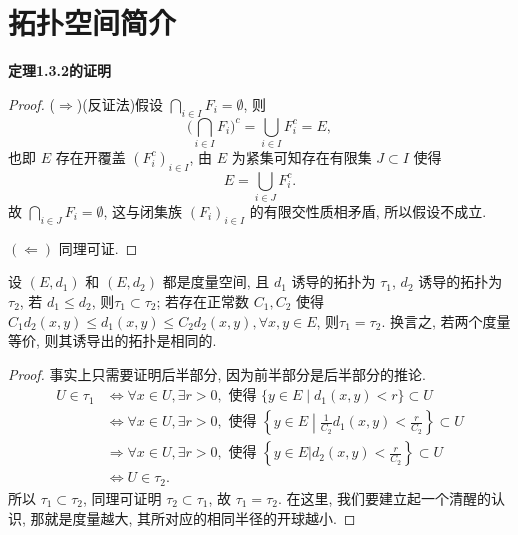 
\chapter{拓扑空间简介}


\textbf{定理1.3.2的证明}
\begin{proof}
($\Rightarrow$)(反证法)假设 $\bigcap_{i\in I}F_i=\emptyset$, 则
\[\biggl(\bigcap_{i\in I}F_i\biggr)^c=\bigcup_{i\in I}F_i^c=E,\]
也即 $E$ 存在开覆盖 $(F_i^c)_{i\in I}$, 由 $E$ 为紧集可知存在有限集
$J\subset I$ 使得
\[E=\bigcup_{i\in J}F_i^c.\]
故 $\bigcap_{i\in J}F_i=\emptyset$, 这与闭集族 $(F_i)_{i\in I}$
的有限交性质相矛盾, 所以假设不成立.

$(\Leftarrow)$ 同理可证.
\end{proof}


\begin{theorem}
    设 $(E,d_1)$ 和 $(E,d_2)$ 都是度量空间,
    且 $d_1$ 诱导的拓扑为 $\tau_1$, $d_2$ 诱导的拓扑为 $\tau_2$,
    若 $d_1\leq d_2$, 则$\tau_1\subset\tau_2$; 若存在正常数 $C_1,C_2$ 使得
    $C_1d_2(x,y)\leq d_1(x,y)\leq C_2d_2(x,y),\forall x,y\in E$, 则$\tau_1=\tau_2$.
    换言之, 若两个度量等价, 则其诱导出的拓扑是相同的.
\end{theorem}

\begin{proof}
事实上只需要证明后半部分, 因为前半部分是后半部分的推论.
\begin{align*}
    U\in\tau_1
    &\Leftrightarrow\forall x\in U,\exists r>0,\text{\ 使得\ }\{y\in E\mid d_1(x,y)<r\}\subset U\\
    &\Leftrightarrow\forall x\in U,\exists r>0, \text{\ 使得\ }\left\{y\in E\middle|\frac{1}{C_2}d_1(x,y)<\frac{r}{C_2}\right\}\subset U\\
    &\Rightarrow\forall x\in U,\exists r>0, \text{\ 使得\ }\left\{y\in E\bigg|d_2(x,y)<\frac{r}{C_2}\right\}\subset U\\
    &\Leftrightarrow U\in\tau_2. 
\end{align*}
所以 $\tau_1\subset\tau_2$, 同理可证明 $\tau_2\subset\tau_1$, 故 $\tau_1=\tau_2$.
在这里, 我们要建立起一个清醒的认识, 那就是度量越大, 其所对应的相同半径的开球越小.
\end{proof}

